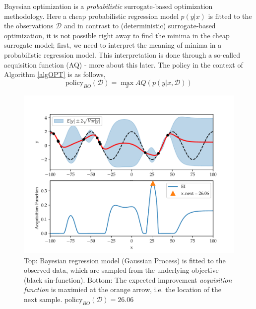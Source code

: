 
\begin{testexample}
    Bayesian optimization is a \textit{probabilistic} surrogate-based optimization methodology. Here
    a cheap probabilistic regression model $p(y|x)$ is fitted to the the observations $\mathcal{D}$
    and in contrast to (deterministic) surrogate-based optimization, it is not possible right away
    to find the minima in the cheap surrogate model; first, we need to interpret the meaning of
    minima in a probabilistic regression model. This interpretation is done through a so-called
    acquisition function (AQ) - more about this later. The policy in the context of Algorithm
    \ref{algOPT} is as follows,
    \begin{equation}\label{BayesOpt}
        \text{policy}_{BO}(\mathcal{D}) = \max_x AQ(p(y|x,\mathcal{D}))
    \end{equation}

    \begin{figure}[H]
        \begin{minipage}[c]{0.67\textwidth}
          \includegraphics[width=\textwidth]{Pictures/BO_example.pdf}
        \end{minipage}\hfill
        \begin{minipage}[c]{0.3\textwidth}
          \caption{Top: Bayesian regression model (Gaussian Process) is fitted to the observed data,
          which are sampled from the underlying objective (black sin-function). Bottom: The expected improvement
          \textit{acquisition function} is maximied at the orange arrow, i.e. the location of the
          next sample.  $\text{policy}_{BO}(\mathcal{D}) = 26.06$} \label{BO_example}
        \end{minipage}
    \end{figure}
\end{testexample}


